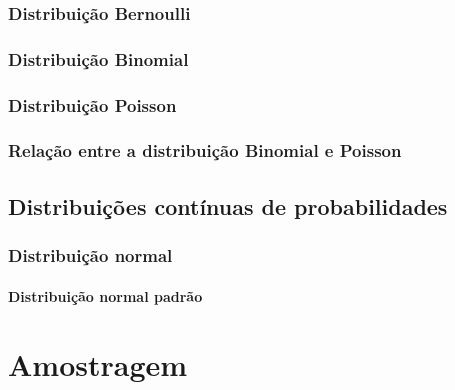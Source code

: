 \documentclass[
]{book}
\begin{document}
\hypertarget{distribuiuxe7uxe3o-bernoulli}{%
\subsection{Distribuição Bernoulli}\label{distribuiuxe7uxe3o-bernoulli}}

\hypertarget{distribuiuxe7uxe3o-binomial}{%
\subsection{Distribuição Binomial}\label{distribuiuxe7uxe3o-binomial}}

\hypertarget{distribuiuxe7uxe3o-poisson}{%
\subsection{Distribuição Poisson}\label{distribuiuxe7uxe3o-poisson}}

\hypertarget{relauxe7uxe3o-entre-a-distribuiuxe7uxe3o-binomial-e-poisson}{%
\subsection{Relação entre a distribuição Binomial e Poisson}\label{relauxe7uxe3o-entre-a-distribuiuxe7uxe3o-binomial-e-poisson}}

\hypertarget{distribuiuxe7uxf5es-contuxednuas-de-probabilidades}{%
\section{Distribuições contínuas de probabilidades}\label{distribuiuxe7uxf5es-contuxednuas-de-probabilidades}}

\hypertarget{distribuiuxe7uxe3o-normal}{%
\subsection{Distribuição normal}\label{distribuiuxe7uxe3o-normal}}

\hypertarget{distribuiuxe7uxe3o-normal-padruxe3o}{%
\subsubsection{Distribuição normal padrão}\label{distribuiuxe7uxe3o-normal-padruxe3o}}

\hypertarget{chap:sampling}{%
\chapter{Amostragem}\label{chap:sampling}}
\end{document}
